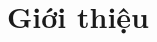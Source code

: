 \documentclass[12pt,a4paper]{article}
\begin{document}








\newpage
{} 
\tableofcontents
\listoffigures
\newpage


\fancyhead[L]{\nouppercase{\leftmark}} 

\section{Giới thiệu}
\end{document}
